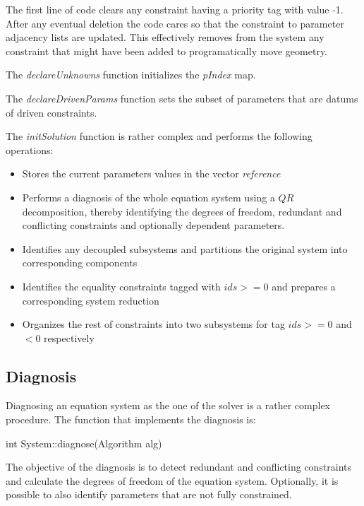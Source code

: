 \documentclass[12pt,twoside,a4paper]{book}
\begin{document}
    The first line of code clears any constraint having a priority tag with value -1. After any eventual deletion the code cares so that the constraint to parameter adjacency lists are updated. This effectively removes from the system any constraint that might have been added to programatically move geometry.

    The \emph{declareUnknowns} function initializes the \emph{pIndex} map.

    The \emph{declareDrivenParams} function sets the subset of parameters that are datums of driven constraints.

    The \emph{initSolution} function is rather complex and performs the following operations:

    \begin{itemize}
     \item Stores the current parameters values in the vector \emph{reference}
     \item Performs a diagnosis of the whole equation system using a $QR$ decomposition, thereby identifying the degrees of freedom, redundant and conflicting constraints and optionally dependent parameters.
     \item Identifies any decoupled subsystems and partitions the original system into corresponding components
     \item Identifies the equality constraints tagged with $ids >= 0$ and prepares a corresponding system reduction
     \item Organizes the rest of constraints into two subsystems for tag $ids >=0$ and $< 0$ respectively
    \end{itemize}

    \subsection{Diagnosis}

    Diagnosing an equation system as the one of the solver is a rather complex procedure. The function that implements the diagnosis is:

    \begin{codequote}
    int System::diagnose(Algorithm alg)
    \end{codequote}

    The objective of the diagnosis is to detect redundant and conflicting constraints and calculate the degrees of freedom of the equation system. Optionally, it is possible to also identify parameters that are not fully constrained.
\end{document}
